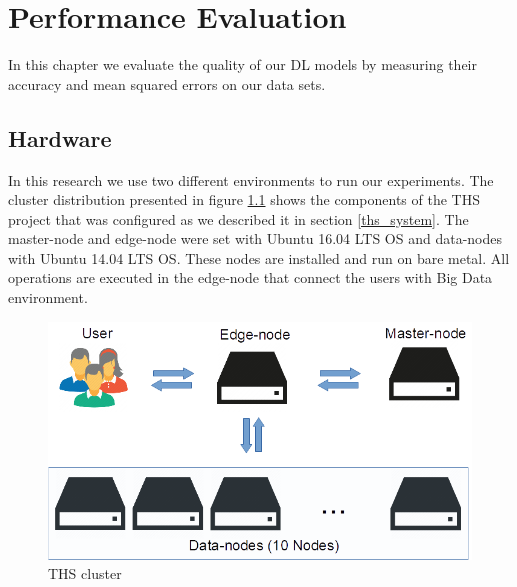 \documentclass[12pt]{report}
\begin{document}

\chapter{Performance Evaluation} \label{chapter 5}
In this chapter we evaluate the quality of our \ac{DL} models by measuring their accuracy and mean squared errors on our data sets. 
\section{Hardware} 

In this research we use two different environments to run our experiments. The cluster distribution presented in figure \ref{figure:ths_cluster} shows the components of the \ac{THS} project that was configured as we described it in section \ref{ths_system}. The master-node and edge-node were set with Ubuntu 16.04 LTS \ac{OS} and data-nodes with Ubuntu 14.04 LTS \ac{OS}. These nodes are installed and run on bare metal. All operations are executed in the edge-node that connect the users with Big Data environment.

\begin{figure}[H]	
	\centering
	\includegraphics[width=150mm, scale = 1]{images/7_ths_cluster.png}	
	\caption{\ac{THS} cluster}	
	\label{figure:ths_cluster}
\end{figure}
\end{document}
